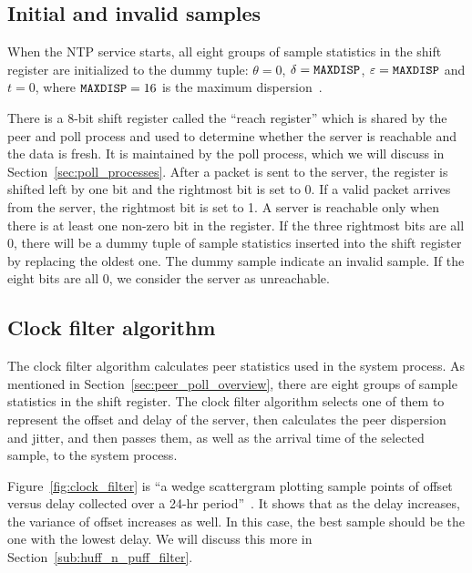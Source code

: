\subsection{Initial and invalid samples}%
\label{sub:initial_and_invalid_samples}
When the NTP service starts, all eight groups of sample statistics in the shift
register are initialized to the dummy tuple: $\theta = 0$, $\delta =
\verb|MAXDISP|$, $\varepsilon = \verb|MAXDISP|$ and $t = 0$, where $\verb|MAXDISP|
= 16$ is the maximum dispersion~\cite{rfc5905}.

There is a 8-bit shift register called the ``reach register'' which is
shared by the peer
and poll process and used to determine whether the server is reachable and the
data is fresh. It is maintained by the poll process, which we will discuss in
Section~\ref{sec:poll_processes}. After a packet is sent to the server, the
register is shifted left by one bit and the rightmost bit is set to 0. If a
valid packet arrives from the server, the rightmost bit is set to 1. A
server is reachable only when there is at least one non-zero bit in the
register. If the three rightmost bits are all 0, there will be a dummy tuple of
sample statistics
inserted into the shift register by replacing the oldest one. The dummy sample
indicate an invalid sample. If the eight bits are all 0, we consider the
server as unreachable.

\subsection{Clock filter algorithm}%
\label{sub:clock_filter_algorithm}
The clock filter algorithm calculates peer statistics used in the system
process.  As mentioned in Section~\ref{sec:peer_poll_overview}, there are eight
groups of sample statistics in the shift register. The clock filter algorithm
selects one of them to represent the offset and delay of the server, then
calculates the peer dispersion and jitter, and then passes them, as well as the
arrival time of the selected sample, to the system process.

Figure~\ref{fig:clock_filter} is ``a wedge scattergram plotting sample points
of offset versus delay collected over a 24-hr period''~\cite{clock_filter}. It
shows that as the delay increases, the variance of offset increases as
well. In this case, the best sample should be the one with the lowest delay. We
will discuss this more in Section~\ref{sub:huff_n_puff_filter}.




